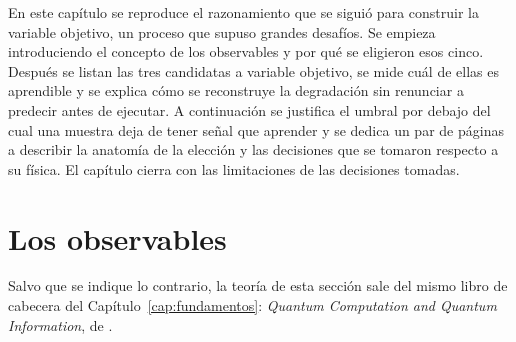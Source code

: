 %
%

En este capítulo se reproduce el razonamiento que se siguió para construir la variable
objetivo, un proceso que supuso grandes desafíos. Se empieza introduciendo el concepto de los
observables y por qué se eligieron esos cinco. Después se listan las tres candidatas a variable
objetivo, se mide cuál de ellas es aprendible y se explica cómo se reconstruye la degradación
sin renunciar a predecir antes de ejecutar. A continuación se justifica el umbral por debajo
del cual una muestra deja de tener señal que aprender y se dedica un par de páginas a describir
la anatomía de la elección y las decisiones que se tomaron respecto a su física. El capítulo
cierra con las limitaciones de las decisiones tomadas.


\section{Los observables}
\label{sec:observables}

Salvo que se indique lo contrario, la teoría de esta sección sale del mismo libro de cabecera del Capítulo~\ref{cap:fundamentos}: \textit{Quantum Computation and Quantum Information}, de .


